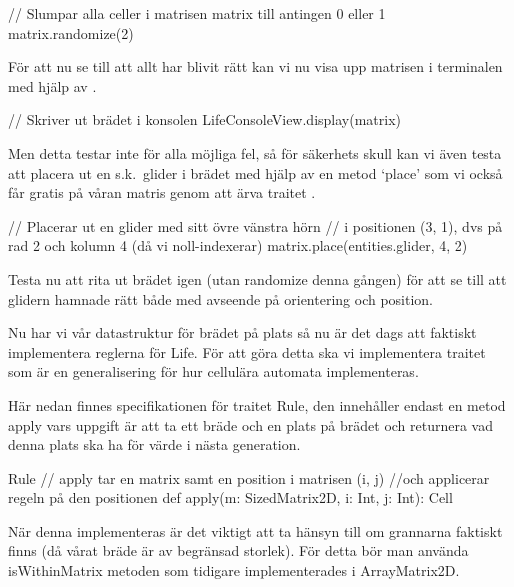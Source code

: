 \begin{Code}
// Slumpar alla celler i matrisen matrix till antingen 0 eller 1
matrix.randomize(2)
\end{Code}

        För att nu se till att allt har blivit rätt kan vi nu visa upp matrisen i terminalen med hjälp av .

\begin{Code}
// Skriver ut brädet i konsolen
LifeConsoleView.display(matrix)
\end{Code}

        Men detta testar inte för alla möjliga fel, så för säkerhets skull kan vi även testa att placera ut en s.k.\ glider i brädet med hjälp av en metod `place' som vi också får gratis på våran matris genom att ärva traitet .

\begin{Code}
// Placerar ut en glider med sitt övre vänstra hörn
// i positionen (3, 1), dvs på rad 2 och kolumn 4 (då vi noll-indexerar)
matrix.place(entities.glider, 4, 2)
\end{Code}

        Testa nu att rita ut brädet igen (utan randomize denna gången) för att se till att glidern hamnade rätt både med avseende på orientering och position.


    Nu har vi vår datastruktur för brädet på plats så nu är det dags att faktiskt implementera reglerna för Life.
    För att göra detta ska vi implementera traitet  som är en generalisering för hur cellulära automata implementeras.

        Här nedan finnes specifikationen för traitet Rule, den innehåller endast en metod apply vars
        uppgift är att ta ett bräde och en plats på brädet och returnera vad denna plats ska ha för
        värde i nästa generation.

\begin{ScalaSpec}{Rule}
// apply tar en matrix samt en position i matrisen (i, j)
//och applicerar regeln på den positionen
def apply(m: SizedMatrix2D, i: Int, j: Int): Cell
\end{ScalaSpec}

        När denna implementeras är det viktigt att ta hänsyn till om grannarna faktiskt finns (då vårat bräde är av begränsad storlek).
        För detta bör man använda isWithinMatrix metoden som tidigare implementerades i ArrayMatrix2D.

